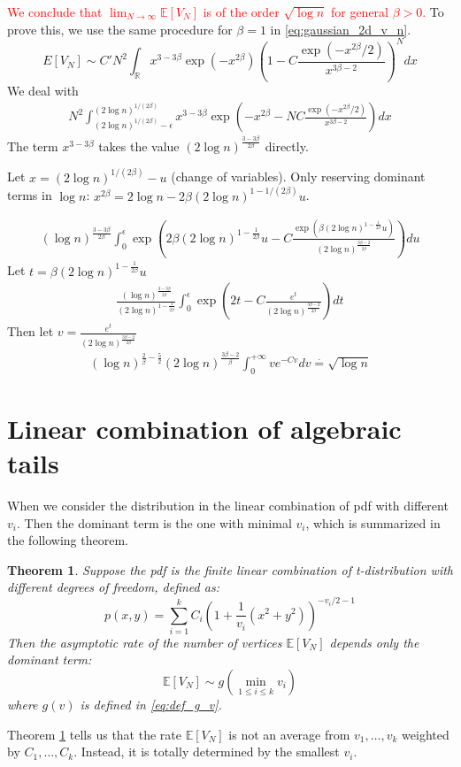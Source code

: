 \documentclass{article}
\newtheorem{theorem}{Theorem}
\def\E{\mathbb{E}}
\def\R{\mathbb{R}}
\begin{document}
\textcolor{red}{We conclude that
$\lim_{N\to \infty} \E[V_N]$
is of the order $\sqrt{\log n}
$ for general $\beta>0$.}
To prove this, we use the same procedure for $\beta=1$
in \eqref{eq:gaussian_2d_v_n}.
$$
E[V_N]
\sim C'
N^2 \int_{\R}
x^{3-3\beta} \exp(-x^{2\beta}) \left(
1-C\frac{\exp(-x^{2\beta}/2)}{x^{3\beta-2}}
\right)^N dx
$$
We deal with 
\begin{align*}
    N^2 \int_{(2\log n)^{1/(2\beta)}-\epsilon}^{(2\log n)^{1/(2\beta)}}
    x^{3-3\beta}\exp\left(
    -x^{2\beta} -N
    C\frac{\exp(-x^{2\beta}/2)}{x^{3\beta-2}}
 \right) dx
\end{align*}
The term $x^{3-3\beta}$ takes the value
$(2\log n)^{\frac{3-3\beta}{2\beta}}$ directly.

Let $x=(2\log n)^{1/(2\beta)}-u$ (change of variables).
Only reserving dominant terms in $\log n$:
$
x^{2\beta} = 2\log n - 2\beta
(2 \log n)^{1-1/(2\beta)}u$.

\begin{align*}
    (\log n)^{\frac{3-3\beta}{2\beta}}
    \int_{0}^{\epsilon}
\exp\left(
    2\beta (2\log n)^{1-\frac{1}{2\beta}} u -
    C\frac{\exp(\beta (2\log n)^{1-\frac{1}{2\beta}} u)}{(2\log n)^{\frac{3\beta-2}{2\beta}}}
 \right) du
\end{align*}
Let $t=\beta (2\log n)^{1-\frac{1}{2\beta}}u$
\begin{align*}
    \frac{(\log n)^{\frac{3-3\beta}{2\beta}}
    }{(2\log n)^{1-\frac{1}{2\beta}}}
    \int_{0}^{\epsilon}
\exp\left(
    2t -
    C\frac{e^t}{(2\log n)^{\frac{3\beta-2}{2\beta}}}
 \right) dt
\end{align*}
Then let $v=\frac{e^t}{(2\log n)^{\frac{3 \beta - 2}{2\beta}}}$
\begin{align*}
    (\log n)^{\frac{2}{\beta} - \frac{5}{2}}
    (2\log n)^{\frac{3 \beta - 2}{\beta}}
    \int_{0}^{+\infty}
ve^{-Cv}dv
\stackrel{\cdot}{=} \sqrt{\log n}
\end{align*}
\section{Linear combination of algebraic tails}
When we consider the distribution in the linear combination
of pdf with different $v_i$.
Then the dominant term is the one with minimal $v_i$,
which is summarized in the following theorem.

\begin{theorem}\label{thm:combination_all}
Suppose the pdf is the finite linear combination of t-distribution with
different degrees of freedom, defined as:
\begin{equation}
    p(x,y) = \sum_{i=1}^k C_i (1+\frac{1}{v_i}(x^2+y^2))^{-v_i/2 - 1}
\end{equation}
Then the asymptotic rate of the number of vertices $\E[V_N]$
depends only the dominant term:
\begin{equation}
    \E[V_N] \sim g(\min_{1\leq i\leq k} v_i)
\end{equation}
where $g(v)$ is defined in \eqref{eq:def_g_v}.
\end{theorem}
Theorem \ref{thm:combination_all} tells us that
the rate $\E[V_N]$ is not an average from $v_1, \dots, v_k$
weighted by $C_1, \dots, C_k$. Instead, it is totally determined by
the smallest $v_i$.
\end{document}
